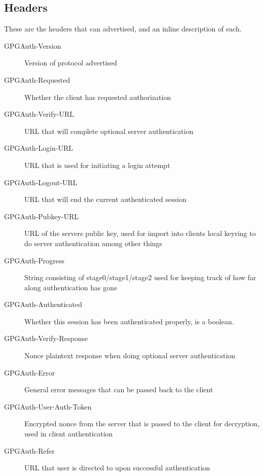 \documentclass[11pt]{article}
\begin{document}
\subsection{Headers} \label{subsec:headers}
These are the headers that can advertised, and an inline description of each.
\begin{description}
	\item[GPGAuth-Version] Version of protocol advertised
	\item[GPGAuth-Requested] Whether the client has requested authorization
	\item[GPGAuth-Verify-URL] URL that will complete optional server authentication
	\item[GPGAuth-Login-URL] URL that is used for initiating a login attempt
	\item[GPGAuth-Logout-URL] URL that will end the current authenticated session
	\item[GPGAuth-Pubkey-URL] URL of the servers public key, used for import into clients local keyring to do server authentication among other things
	\item[GPGAuth-Progress] String consisting of stage0/stage1/stage2 used for keeping track of how far along authentication has gone
	\item[GPGAuth-Authenticated] Whether this session has been authenticated properly, is a boolean.
	\item[GPGAuth-Verify-Response] Nonce plaintext response when doing optional server authentication
	\item[GPGAuth-Error] General error messages that can be passed back to the client
	\item[GPGAuth-User-Auth-Token] Encrypted nonce from the server that is passed to the client for decryption, used in client authentication
	\item[GPGAuth-Refer] URL that user is directed to upon successful authentication
\end{description}
\end{document}
